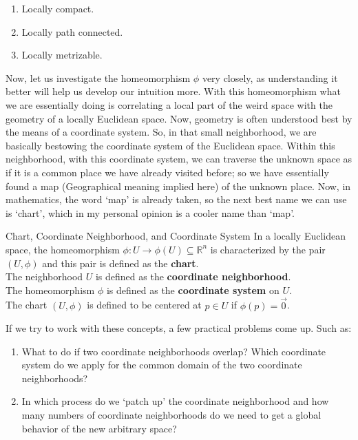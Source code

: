 \begin{enumerate}
	\item Locally compact.
	\item Locally path connected.
	\item Locally metrizable.
\end{enumerate}
Now, let us investigate the homeomorphism $\phi$ very closely, as understanding it better will help us develop our intuition more. With this homeomorphism what we are essentially doing is correlating a local part of the weird space with the geometry of a locally Euclidean space. Now, geometry is often understood best by the means of a coordinate system. So, in that small neighborhood, we are basically bestowing the coordinate system of the Euclidean space. Within this neighborhood, with this coordinate system, we can traverse the unknown space as if it is a common place we have already visited before; so we have essentially found a map (Geographical meaning implied here) of the unknown place. Now, in mathematics, the word `map' is already taken, so the next best name we can use is `chart', which in my personal opinion is a cooler name than `map'.
\begin{Definition}{Chart, Coordinate Neighborhood, and Coordinate System}\label{chart_coordinate_neighborhood_coordinate_system}
	In a locally Euclidean space, the homeomorphism $\phi: U\to \phi(U)\subseteq \mathbb{R}^n$ is characterized by the pair $(U,\phi)$ and this pair is defined as the \textbf{chart}.\\
	The neighborhood $U$ is defined as the \textbf{coordinate neighborhood}.\\
	The homeomorphism $\phi$ is defined as the \textbf{coordinate system} on $U$.\\
	The chart $(U,\phi)$ is defined to be centered at $p\in U$ if $\phi(p)=\vec{0}$.
\end{Definition}
\noindent If we try to work with these concepts, a few practical problems come up. Such as:
\begin{enumerate}
	\item What to do if two coordinate neighborhoods overlap? Which coordinate system do we apply for the common domain of the two coordinate neighborhoods?
	\item In which process do we `patch up' the coordinate neighborhood and how many numbers of coordinate neighborhoods do we need to get a global behavior of the new arbitrary space?
\end{enumerate}
